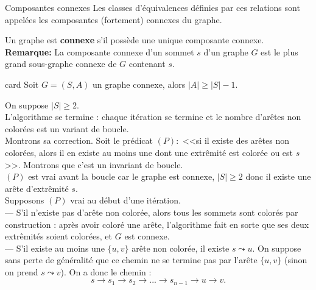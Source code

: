 \documentclass[french, 11pt]{article}
\begin{document}
\begin{defi}{Composantes connexes}{}
    Les classes d'équivalences définies par ces relations sont appelées les composantes (fortement) connexes du graphe.
\end{defi}

\begin{defi}{}{}
    Un graphe est \textbf{connexe} s'il possède une unique composante connexe.\\
    \textbf{Remarque:} La composante connexe d'un sommet $s$ d'un graphe $G$ est le plus grand sous-graphe connexe de $G$ contenant $s$. 
\end{defi}

\begin{prop}{}{card}
    Soit $G=(S,A)$ un graphe connexe, alors $|A|\geq|S|-1$.
    \tcblower
    \begin{algorithm}[H]
        \caption{}
    \end{algorithm}
    On suppose $|S|\geq2$.\\
    L'algorithme se termine : chaque itération se termine et le nombre d'arêtes non colorées est un variant de boucle.\\
    Montrons sa correction. Soit le prédicat $(P):$ <<si il existe des arêtes non colorées, alors il en existe au moins une dont une extrêmité est colorée ou est $s$>>. Montrons que c'est un invariant de boucle.\\
    $(P)$ est vrai avant la boucle car le graphe est connexe, $|S|\geq2$ donc il existe une arête d'extrêmité $s$.\\
    Supposons $(P)$ vrai au début d'une itération.\\
    --- S'il n'existe pas d'arête non colorée, alors tous les sommets sont colorés par construction : après avoir coloré une arête, l'algorithme fait en sorte que ses deux extrêmités soient colorées, et $G$ est connexe.\\
    --- S'il existe au moins une $\{u,v\}$ arête non colorée, il existe $s\leadsto u$. On suppose sans perte de généralité que ce chemin ne se termine pas par l'arête $\{u,v\}$ (sinon on prend $s\leadsto v$). On a donc le chemin : \begin{equation*}s\to s_1 \to s_2 \to ... \to s_{n-1} \to u \to v.\end{equation*}

\end{prop}
\end{document}
